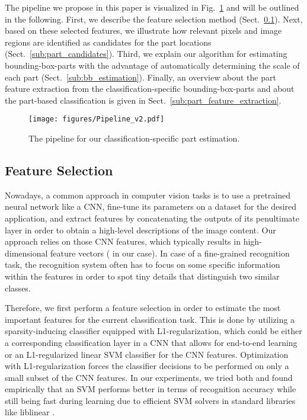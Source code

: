 \documentclass[runningheads]{llncs}
\begin{document}
The pipeline we propose in this paper is visualized in Fig.~\ref{fig:pipeline} and will be outlined in the following.
First, we describe the feature selection method (Sect.~\ref{sub:feature_selection}).
Next, based on these selected features, we illustrate how relevant pixels and image regions are identified as candidates for the part locations (Sect.~\ref{sub:part_candidates}).
Third, we explain our algorithm for estimating bounding-box-parts with the advantage of automatically determining the scale of each part (Sect.~\ref{sub:bb_estimation}).
Finally, an overview about the part feature extraction from the classification-specific bounding-box-parts and about the part-based classification is given in Sect.~\ref{sub:part_feature_extraction}.

\begin{figure}[t]
	\centering
	\texttt{[image: figures/Pipeline\_v2.pdf]}
	\caption{The pipeline for our classification-specific part estimation.}
	\label{fig:pipeline}
\end{figure}

\subsection{Feature Selection}
\label{sub:feature_selection}
\vspace{-.1cm}

Nowadays, a common approach in computer vision tasks is to use a pretrained neural network like a CNN, fine-tune its parameters on a dataset for the desired application, and extract features by concatenating the outputs of its penultimate layer in order to obtain a high-level descriptions of the image content.
Our approach relies on those CNN features, which typically results in high-dimensional feature vectors ( in our case).
In case of a fine-grained recognition task, the recognition system often has to focus on some specific information within the features in order to spot tiny details that distinguish two similar classes.

Therefore, we first perform a feature selection in order to estimate the most important features for the current classification task.
This is done by utilizing a sparsity-inducing classifier equipped with L1-regularization, which could be either a corresponding classification layer in a CNN that allows for end-to-end learning or an L1-regularized linear SVM classifier for the CNN features.
Optimization with L1-regularization forces the classifier decisions to be performed on only a small subset of the CNN features.
In our experiments, we tried both and found empirically that an SVM performs better in terms of recognition accuracy while still being fast during learning due to efficient SVM solvers in standard libraries like liblinear \cite{fan2008liblinear}.
\end{document}
